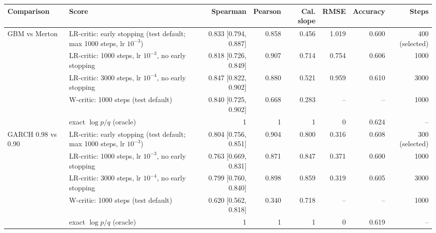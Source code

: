 \begin{tabular}{llrrrrrr}
\toprule
Comparison & Score & Spearman & Pearson & Cal. slope & RMSE & Accuracy & Steps \\
\midrule
GBM vs Merton & LR-critic: early stopping (test default; max 1000 steps, lr $10^{-3}$) & 0.833 [0.794, 0.887] & 0.858 & 0.456 & 1.019 & 0.600 & 400 (selected) \\
 & LR-critic: 1000 steps, lr $10^{-3}$, no early stopping & 0.818 [0.726, 0.849] & 0.907 & 0.714 & 0.754 & 0.606 & 1000 \\
 & LR-critic: 3000 steps, lr $10^{-4}$, no early stopping & 0.847 [0.822, 0.902] & 0.880 & 0.521 & 0.959 & 0.610 & 3000 \\
 & W-critic: 1000 steps (test default) & 0.840 [0.725, 0.902] & 0.668 & 0.283 & -- & -- & 1000 \\
 & exact $\log p/q$ (oracle) & 1 & 1 & 1 & 0 & 0.624 & -- \\
GARCH 0.98 vs 0.90 & LR-critic: early stopping (test default; max 1000 steps, lr $10^{-3}$) & 0.804 [0.756, 0.851] & 0.904 & 0.800 & 0.316 & 0.608 & 300 (selected) \\
 & LR-critic: 1000 steps, lr $10^{-3}$, no early stopping & 0.763 [0.669, 0.831] & 0.871 & 0.847 & 0.371 & 0.600 & 1000 \\
 & LR-critic: 3000 steps, lr $10^{-4}$, no early stopping & 0.799 [0.760, 0.840] & 0.898 & 0.859 & 0.319 & 0.605 & 3000 \\
 & W-critic: 1000 steps (test default) & 0.620 [0.562, 0.818] & 0.340 & 0.718 & -- & -- & 1000 \\
 & exact $\log p/q$ (oracle) & 1 & 1 & 1 & 0 & 0.619 & -- \\
\bottomrule
\end{tabular}
